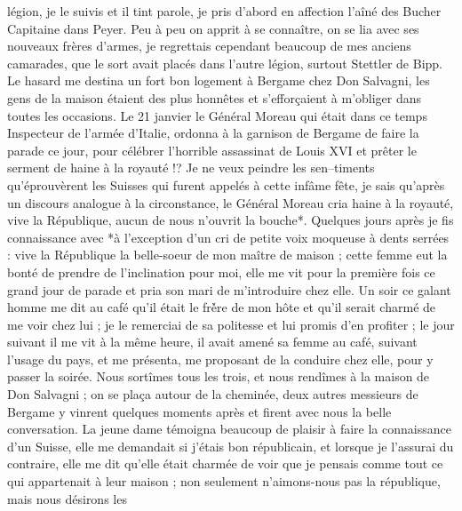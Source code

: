 \documentclass[12pt]{article}
\begin{document}
 légion, je le suivis et il tint parole, je pris
d’abord en affection l’aîné des Bucher Capitaine dans Peyer. Peu à peu on apprit à se connaître, on
se lia avec ses nouveaux frères d’armes, je regrettais cependant beaucoup de mes anciens camarades,
que le sort avait placés dans l’autre légion, surtout Stettler de Bipp. Le hasard me destina un fort
bon logement à Bergame chez Don Salvagni, les gens de la maison étaient des plus honnêtes et
s’efforçaient à m’obliger dans toutes les occasions. Le 21 janvier le Général Moreau qui était dans
ce temps Inspecteur de l’armée d’Italie, ordonna à la garnison de Bergame de faire la parade ce
jour, pour célébrer l’horrible assassinat de Louis XVI et prêter le serment de haine à la royauté !?
Je ne veux peindre les sen–timents qu’éprouvèrent les Suisses qui furent appelés à cette infâme
fête, je sais qu’après un discours analogue à la circonstance, le Général Moreau cria haine à la
royauté, vive la République, aucun de nous n’ouvrit la bouche*. Quelques jours après je fis
connaissance avec *à l’exception d’un cri de petite voix moqueuse à dents serrées : vive la
République la belle-soeur de mon maître de maison ; cette femme eut la bonté de prendre de
l’inclination pour moi, elle me vit pour la première fois ce grand jour de parade et pria son mari
de m’introduire chez elle. Un soir ce galant homme me dit au café qu’il était le frè́re de mon hôte
et qu’il serait charmé de me voir chez lui ; je le remerciai de sa politesse et lui promis d’en
profiter ; le jour suivant il me vit à la même heure, il avait amené sa femme au café, suivant
l’usage du pays, et me présenta, me proposant de la conduire chez elle, pour y passer la soirée.
Nous sortîmes tous les trois, et nous rendîmes à la maison de Don Salvagni ; on se plaça autour de
la cheminée, deux autres messieurs de Bergame y vinrent quelques moments après et firent avec nous
la belle conversation. La jeune dame témoigna beaucoup de plaisir à faire la connaissance d’un
Suisse, elle me demandait si j’étais bon républicain, et lorsque je l’assurai du contraire, elle me
dit qu’elle était charmée de voir que je pensais comme tout ce qui appartenait à leur maison ; non
seulement n’aimons-nous pas la république, mais nous désirons les
\end{document}
